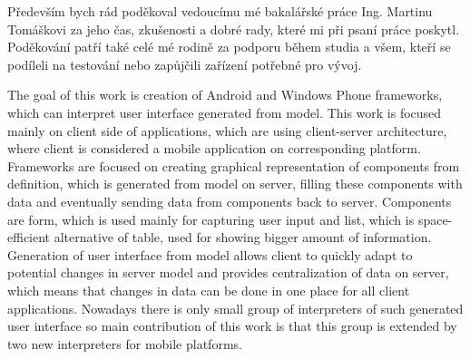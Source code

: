 \documentclass[11pt,twoside,a4paper]{book}
\begin{document}
	\coverpagestarts


	\acknowledgements
	\noindent
	Především bych rád poděkoval vedoucímu mé bakalářské práce Ing. Martinu Tomáškovi za jeho čas, zkušenosti a dobré rady, které mi při psaní práce poskytl. Poděkování patří také celé mé rodině za podporu během studia a všem, kteří se podíleli na testování nebo zapůjčili zařízení potřebné pro vývoj.





 
	\abstractpage

	The goal of this work is creation of Android and Windows Phone frameworks, which can interpret user interface generated from model. This work is focused mainly on client side of applications, which are using client-server architecture, where client is considered a mobile application on corresponding platform. Frameworks are focused on creating graphical representation of components from definition, which is generated from model on server, filling these components with data and eventually sending data from components back to server. Components are form, which is used mainly for capturing user input and list, which is space-efficient alternative of table, used for showing bigger amount of information. Generation of user interface from model allows client to quickly adapt to potential changes in server model and provides centralization of data on server, which means that changes in data can be done in one place for all client applications. Nowadays there is only small group of interpreters of such generated user interface so main contribution of this work is that this group is extended by two new interpreters for mobile platforms.


	\baselineskip
\end{document}
